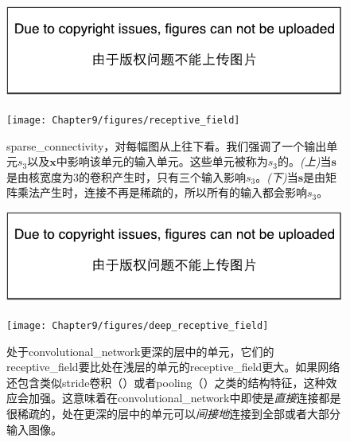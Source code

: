 \begin{figure}[!htb]
\ifOpenSource
\centerline{\includegraphics{figure.pdf}}
\else
\centerline{\texttt{[image: Chapter9/figures/receptive\_field]}}
\fi
\captionsetup{singlelinecheck=off}
\caption[Caption for LOF]{\gls{sparse_connectivity}，对每幅图从上往下看。我们强调了一个输出单元$s_3$以及$\bm{x}$中影响该单元的输入单元。这些单元被称为$s_3$的\protect\footnotemark。\emph{(上)}当$\bm{s}$是由核宽度为3的卷积产生时，只有三个输入影响$s_3$。\emph{(下)}当$\bm{s}$是由矩阵乘法产生时，连接不再是稀疏的，所以所有的输入都会影响$s_3$。}
\label{fig:chap9_receptive_field}
\end{figure}

\begin{figure}[!htb]
\ifOpenSource
\centerline{\includegraphics{figure.pdf}}
\else
\centerline{\texttt{[image: Chapter9/figures/deep\_receptive\_field]}}
\fi
\caption{处于\gls{convolutional_network}更深的层中的单元，它们的\gls{receptive_field}要比处在浅层的单元的\gls{receptive_field}更大。如果网络还包含类似\gls{stride}卷积（）或者\gls{pooling}（）之类的结构特征，这种效应会加强。这意味着在\gls{convolutional_network}中即使是\emph{直接}连接都是很稀疏的，处在更深的层中的单元可以\emph{间接地}连接到全部或者大部分输入图像。}
\label{fig:chap9_deep_receptive_field}
\end{figure}

 
